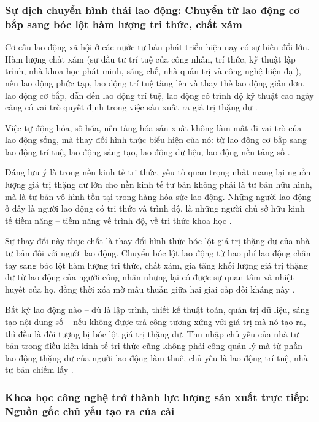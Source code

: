 \subsubsection{Sự dịch chuyển hình thái lao động: Chuyển từ lao động cơ bắp sang bóc lột hàm lượng tri thức, chất xám}

Cơ cấu lao động xã hội ở các nước tư bản phát triển hiện nay có sự biến đổi lớn. Hàm lượng chất xám (sự đầu tư trí tuệ của công nhân, trí thức, kỹ thuật lập trình, nhà khoa học phát minh, sáng chế, nhà quản trị và công nghệ hiện đại), nên lao động phức tạp, lao động trí tuệ tăng lên và thay thế lao động giản đơn, lao động cơ bắp, dẫn đến lao động trí tuệ, lao động có trình độ kỹ thuật cao ngày càng có vai trò quyết định trong việc sản xuất ra giá trị thặng dư \cite{tran_hieu_gttd}.

Việc tự động hóa, số hóa, nền tảng hóa sản xuất không làm mất đi vai trò của lao động sống, mà thay đổi hình thức biểu hiện của nó: từ lao động cơ bắp sang lao động trí tuệ, lao động sáng tạo, lao động dữ liệu, lao động nền tảng số \cite{tran_hieu_gttd}.

Đáng lưu ý là trong nền kinh tế tri thức, yếu tố quan trọng nhất mang lại nguồn lượng giá trị thặng dư lớn cho nền kinh tế tư bản không phải là tư bản hữu hình, mà là tư bản vô hình tồn tại trong hàng hóa sức lao động. Những người lao động ở đây là người lao động có tri thức và trình độ, là những người chủ sở hữu kinh tế tiềm năng -- tiềm năng về trình độ, về tri thức khoa học \cite{tapchi_congthuong_gttd}.

Sự thay đổi này thực chất là thay đổi hình thức bóc lột giá trị thặng dư của nhà tư bản đối với người lao động. Chuyển bóc lột lao động từ hao phí lao động chân tay sang bóc lột hàm lượng tri thức, chất xám, gia tăng khối lượng giá trị thặng dư từ lao động của người công nhân nhưng lại có được sự quan tâm và nhiệt huyết của họ, đồng thời xóa mờ mâu thuẫn giữa hai giai cấp đối kháng này \cite{tapchi_congthuong_gttd}.

Bất kỳ lao động nào -- dù là lập trình, thiết kế thuật toán, quản trị dữ liệu, sáng tạo nội dung số -- nếu không được trả công tương xứng với giá trị mà nó tạo ra, thì đều là đối tượng bị bóc lột giá trị thặng dư. Thu nhập chủ yếu của nhà tư bản trong điều kiện kinh tế tri thức cũng không phải công quản lý mà từ phần lao động thặng dư của người lao động làm thuê, chủ yếu là lao động trí tuệ, nhà tư bản chiếm lấy \cite{tran_hieu_gttd}.

\subsubsection{Khoa học công nghệ trở thành lực lượng sản xuất trực tiếp: Nguồn gốc chủ yếu tạo ra của cải}

